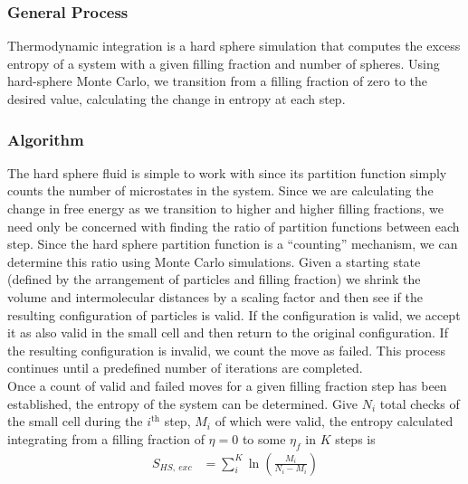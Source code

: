 \documentclass[12pt]{article}
\begin{document}
\subsubsection{General Process}
Thermodynamic integration is a hard sphere simulation that computes the excess entropy of a system with a given filling fraction and number of spheres. Using hard-sphere Monte Carlo, we transition from a filling fraction of zero to the desired value, calculating the change in entropy at each step. 

\subsubsection{Algorithm}
The hard sphere fluid is simple to work with since its partition function simply counts the number of microstates in the system\cite{valeskethesis}. Since we are calculating the change in free energy as we transition to higher and higher filling fractions, we need only be concerned with finding the ratio of partition functions between each step. Since the hard sphere partition function is a ``counting'' mechanism, we can determine this ratio using Monte Carlo simulations. Given a starting state (defined by the arrangement of particles and filling fraction) we shrink the volume and intermolecular distances by a scaling factor and then see if the resulting configuration of particles is valid. If the configuration is valid, we accept it as also valid in the small cell and then return to the original configuration. If the resulting configuration is invalid, we count the move as failed. This process continues until a predefined number of iterations are completed.\\


Once a count of valid and failed moves for a given filling fraction step has been established, the entropy of the system can be determined. Give $N_i$ total checks of the small cell during the $i^{\text{th}}$ step, $M_i$ of which were valid, the entropy calculated integrating from a filling fraction of $\eta=0$ to some $\eta_f$ in $K$ steps is
\begin{align}
    S_{HS,~exc} &= \sum_i^K \ln\left(\frac{M_i}{N_i-M_i}\right)
\end{align}
\end{document}
